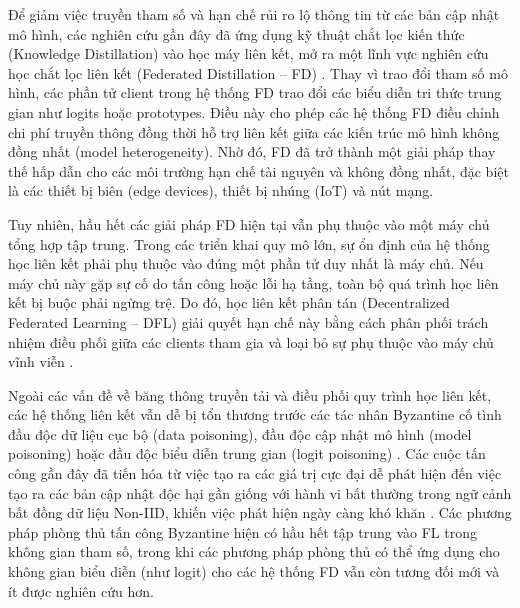 Để giảm việc truyền tham số và hạn chế rủi ro lộ thông tin từ các bản cập nhật mô hình, các nghiên cứu gần đây đã ứng dụng kỹ thuật chắt lọc kiến thức (Knowledge Distillation) \cite{hinton2015kd} vào học máy liên kết, mở ra một lĩnh vực nghiên cứu học chắt lọc liên kết (Federated Distillation -- FD) \cite{li2024fdsurvey}. Thay vì trao đổi tham số mô hình, các phần tử client trong hệ thống FD trao đổi các biểu diễn tri thức trung gian như logits hoặc prototypes. Điều này cho phép các hệ thống FD điều chỉnh chi phí truyền thông đồng thời hỗ trợ liên kết giữa các kiến trúc mô hình không đồng nhất (model heterogeneity). Nhờ đó, FD đã trở thành một giải pháp thay thế hấp dẫn cho các môi trường hạn chế tài nguyên và không đồng nhất, đặc biệt là các thiết bị biên (edge devices), thiết bị nhúng (IoT) và nút mạng.

Tuy nhiên, hầu hết các giải pháp FD hiện tại vẫn phụ thuộc vào một máy chủ tổng hợp tập trung. Trong các triển khai quy mô lớn, sự ổn định của hệ thống học liên kết phải phụ thuộc vào đúng một phần tử duy nhất là máy chủ. Nếu máy chủ này gặp sự cố do tấn công hoặc lỗi hạ tầng, toàn bộ quá trình học liên kết bị buộc phải ngừng trệ. Do đó, học liên kết phân tán (Decentralized Federated Learning -- DFL) giải quyết hạn chế này bằng cách phân phối trách nhiệm điều phối giữa các clients tham gia và loại bỏ sự phụ thuộc vào máy chủ vĩnh viễn \cite{braintorrent}.

Ngoài các vấn đề về băng thông truyền tải và điều phối quy trình học liên kết, các hệ thống liên kết vẫn dễ bị tổn thương trước các tác nhân Byzantine cố tình đầu độc dữ liệu cục bộ (data poisoning), đầu độc cập nhật mô hình (model poisoning) hoặc đầu độc biểu diễn trung gian (logit poisoning) \cite{tolpegin2020targetedflip, fang2020attacks, roux2025byzantine}. Các cuộc tấn công gần đây đã tiến hóa từ việc tạo ra các giá trị cực đại dễ phát hiện đến việc tạo ra các bản cập nhật độc hại gần giống với hành vi bất thường trong ngữ cảnh bất đồng dữ liệu Non-IID, khiến việc phát hiện ngày càng khó khăn \cite{roux2025byzantine}. Các phương pháp phòng thủ tấn công Byzantine hiện có hầu hết tập trung vào FL trong không gian tham số, trong khi các phương pháp phòng thủ có thể ứng dụng cho không gian biểu diễn (như logit) cho các hệ thống FD vẫn còn tương đối mới và ít được nghiên cứu hơn.

